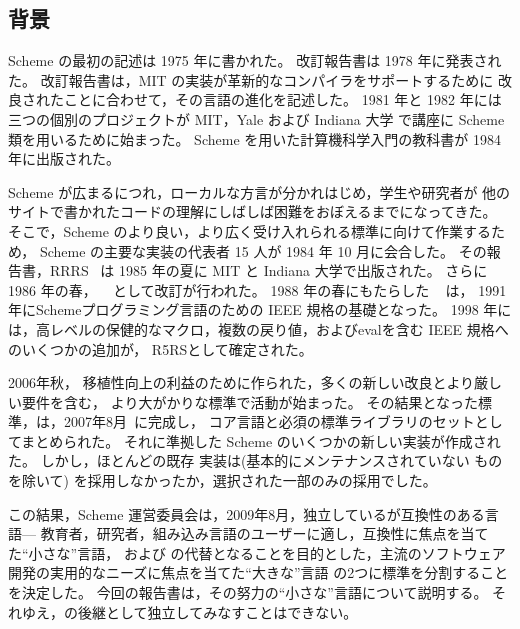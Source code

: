 \subsection*{背景}

\vest Scheme の最初の記述は 1975 年に書かれた\cite{Scheme75}。
改訂報告書は 1978 年に発表された\cite{Scheme78}。
改訂報告書は，MIT の実装が革新的なコンパイラ\cite{Rabbit}をサポートするために
改良されたことに合わせて，その言語の進化を記述した。
1981 年と 1982 年には三つの個別のプロジェクトが MIT，Yale および Indiana 大学
で講座に Scheme 類を用いるために始まった\cite{Rees82,MITScheme,Scheme311}。
Scheme を用いた計算機科学入門の教科書が 1984 年に出版された\cite{SICP}。

\vest Scheme が広まるにつれ，ローカルな方言が分かれはじめ，学生や研究者が
他のサイトで書かれたコードの理解にしばしば困難をおぼえるまでになってきた。
そこで，Scheme のより良い，より広く受け入れられる標準に向けて作業するため，
Scheme の主要な実装の代表者 15 人が 1984 年 10 月に会合した。
その報告書，RRRS~\cite{RRRS} は
1985 年の夏に MIT と Indiana 大学で出版された。
さらに 1986 年の春， \rthreers~\cite{R3RS} として改訂が行われた。
1988 年の春にもたらした \rfourrs~\cite{R4RS} は，
1991 年にSchemeプログラミング言語のための IEEE 規格の基礎となった。
1998 年には，高レベルの保健的なマクロ，複数の戻り値，および{\cf eval}を含む
IEEE 規格へのいくつかの追加が，
R5RSとして確定された。


2006年秋，
移植性向上の利益のために作られた，多くの新しい改良とより厳しい要件を含む，
より大がかりな標準で活動が始まった。
その結果となった標準，\rsixrs は，2007年8月~\cite{R6RS}に完成し，
コア言語と必須の標準ライブラリのセットとしてまとめられた。
それに準拠した Scheme のいくつかの新しい実装が作成された。
しかし，ほとんどの既存 \rfivers{} 実装は(基本的にメンテナンスされていない
ものを除いて) \rsixrs を採用しなかったか，選択された一部のみの採用でした。

この結果，Scheme 運営委員会は，2009年8月，独立しているが互換性のある言語---
教育者，研究者，組み込み言語のユーザーに適し，\rfivers 互換性に焦点を当てた``小さな''言語，
および
\rsixrs の代替となることを目的とした，主流のソフトウェア開発の実用的なニーズに焦点を当てた``大きな''言語
の2つに標準を分割することを決定した。
今回の報告書は，その努力の``小さな''言語について説明する。
それゆえ，\rsixrs の後継として独立してみなすことはできない。



